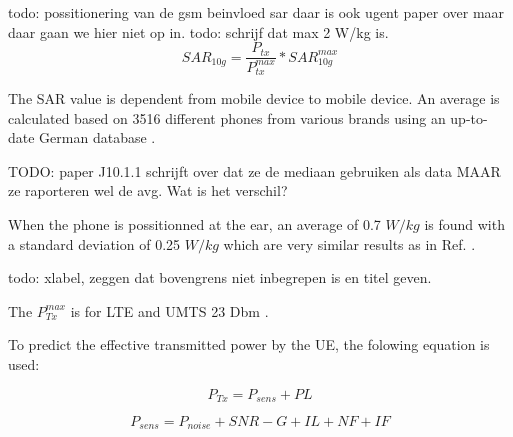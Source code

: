todo: possitionering van de gsm beinvloed sar daar is ook ugent paper over maar daar gaan we hier niet op in.
todo: schrijf dat max 2 W/kg is.
\begin{equation}
{SAR}_{10g} = \frac{P_{tx}}{P^{max}_{tx}} * {SAR}^{max}_{10g}
\label{eq:calculatesar}
\end{equation}

The SAR value is dependent from mobile device to mobile device. An average is calculated based on 3516 different phones from various brands using an up-to-date German database \cite{SARDatabase}.

TODO: paper J10.1.1 schrijft over dat ze de mediaan gebruiken als data MAAR ze raporteren wel de avg. Wat is het verschil?

When the phone is possitionned at the ear, an average of 0.7 $W/kg$ is found with a standard deviation of 0.25 $W/kg$ which are very similar results as in Ref. \cite{j10.1.1_gati2010duality}.

todo: xlabel, zeggen dat bovengrens niet inbegrepen is en titel geven.


The $P^{max}_{Tx}$ is for LTE and UMTS 23 Dbm \cite{J11_maxTpxUE, J10_RDP}.

To predict the effective transmitted power by the \gls{UE}, the folowing equation is used:

\begin{equation}
P_{Tx} = P_{sens} + PL
\label{eq:calculatesar}
\end{equation}

\begin{equation}
P_{sens} = P_{noise} + SNR - G + IL + NF + IF
\label{eq:calculatepsens}
\end{equation}